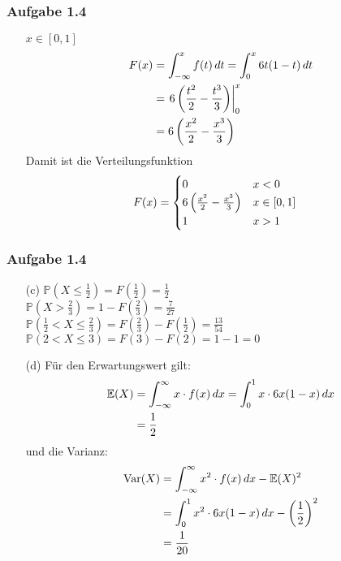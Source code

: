 \documentclass[ngerman,t]{beamer}
\DeclareMathOperator{\Var}{Var}
\newcommand{\E}{\mathbb{E}}
\begin{document}
	\begin{frame}
		\frametitle{Aufgabe 1.4}
		\begin{itemize}
			\item[] $x\in [0,1]$
			\begin{align}
				F(x) &= \int_{-\infty}^x f(t)\,dt = \int_{0}^x 6t(1-t)\,dt \notag \\
				&= \left.6\left(\frac{t^2}{2} - \frac{t^3}{3}\right)\right\vert_0^x \notag \\
				&= 6\left(\frac{x^2}{2} - \frac{x^3}{3}\right) \notag
			\end{align}
			\pause
			Damit ist die Verteilungsfunktion
			\begin{align}
				F(x) &= \begin{cases}
					0 & x<0 \\
					6\left(\frac{x^2}{2} - \frac{x^3}{3}\right) &x\in [0,1] \\
					1 & x>1
				\end{cases} \notag
			\end{align}
		\end{itemize}
	\end{frame}
	\begin{frame}
		\frametitle{Aufgabe 1.4}
		\begin{itemize}
			\item[(c)] $\mathbb{P}(X\le \frac{1}{2}) = F(\frac{1}{2}) = \frac{1}{2}$ \pause \\
			$\mathbb{P}(X> \frac{2}{3}) = 1 - F(\frac{2}{3}) = \frac{7}{27}$ \pause \\
			$\mathbb{P}(\frac{1}{2} < X \le \frac{2}{3}) = F(\frac{2}{3}) - F(\frac{1}{2}) = \frac{13}{54}$ \pause \\
			$\mathbb{P}(2 < X\le 3) = F(3) - F(2) = 1 - 1 = 0$
			\pause
			\item[(d)] Für den Erwartungswert gilt:
			\begin{align}
				\E(X) &= \int_{-\infty}^\infty x\cdot f(x)\,dx = \int_{0}^1 x\cdot 6x(1-x)\,dx \notag \\
				&= \frac{1}{2} \notag
			\end{align}
			\pause
			und die Varianz:
			\begin{align}
				\Var(X) &= \int_{-\infty}^\infty x^2\cdot f(x)\,dx - \E(X)^2 \notag \\
				&= \int_{0}^1 x^2\cdot 6x(1-x)\,dx - \left(\frac{1}{2}\right)^2 \notag \\
				&= \frac{1}{20} \notag
			\end{align}
		\end{itemize}
	\end{frame}
\end{document}

